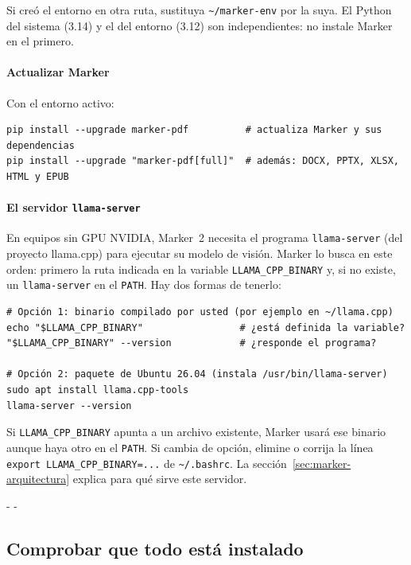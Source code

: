 \documentclass[11pt,a4paper]{article}
\makeatletter
\newcommand{\necesitaespacio}[1]{\par\penalty-100\begingroup
	\setlength{\dimen@}{#1}\dimen@ii\pagegoal\advance\dimen@ii-\pagetotal
	\ifdim\dimen@>\dimen@ii\ifdim\dimen@ii>\z@\vfil\fi\penalty-\@M\fi\endgroup}
\newcommand{\cmd}[1]{\texttt{\textcolor{colcmd}{#1}}}      %
\newcommand{\arch}[1]{\texttt{\textcolor{colarch}{#1}}}    %
\newcommand{\tl}{\textasciitilde{}}  %
\makeatother
\begin{document}
	Si creó el entorno en otra ruta, sustituya \arch{\tl/marker-env} por la suya. El Python del sistema (3.14) y el del entorno (3.12) son independientes: no instale Marker en el primero.
	
	\paragraph{Actualizar Marker} Con el entorno activo:
	
	\begin{lstlisting}
pip install --upgrade marker-pdf          # actualiza Marker y sus dependencias
pip install --upgrade "marker-pdf[full]"  # además: DOCX, PPTX, XLSX, HTML y EPUB
\end{lstlisting}
	
	\paragraph{El servidor \texttt{llama-server}} En equipos sin GPU NVIDIA, Marker~2 necesita el programa \cmd{llama-server} (del proyecto llama.cpp) para ejecutar su modelo de visión. Marker lo busca en este orden: primero la ruta indicada en la variable \texttt{LLAMA\_CPP\_BINARY} y, si no existe, un \cmd{llama-server} en el \texttt{PATH}. Hay dos formas de tenerlo:
	
	\begin{lstlisting}
# Opción 1: binario compilado por usted (por ejemplo en ~/llama.cpp)
echo "$LLAMA_CPP_BINARY"                 # ¿está definida la variable?
"$LLAMA_CPP_BINARY" --version            # ¿responde el programa?

# Opción 2: paquete de Ubuntu 26.04 (instala /usr/bin/llama-server)
sudo apt install llama.cpp-tools
llama-server --version
\end{lstlisting}
	
	\begin{nota}
		Si \texttt{LLAMA\_\allowbreak{}CPP\_\allowbreak{}BINARY} apunta a un archivo existente, Marker usará ese binario aunque haya otro en el \texttt{PATH}. Si cambia de opción, elimine o corrija la línea \texttt{export LLAMA\_\allowbreak{}CPP\_\allowbreak{}BINARY=\allowbreak{}...} de \arch{\tl/.bashrc}. La sección~\ref{sec:marker-arquitectura} explica para qué sirve este servidor.
	\end{nota}
	
	\necesitaespacio{10\baselineskip}
	\subsection{Comprobar que todo está instalado}
	
\end{document}
